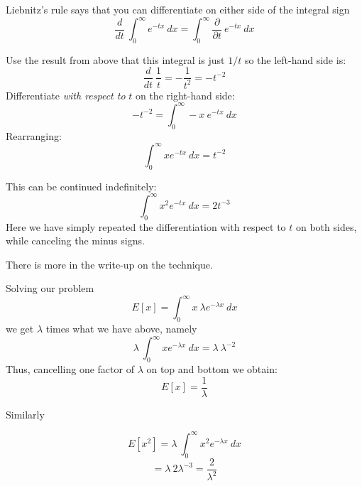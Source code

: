 \documentclass[11pt, oneside]{article}
\begin{document}
Liebnitz's rule says that you can differentiate on either side of the integral sign
\[ \frac{d}{dt} \ \int_0^{\infty} e^{-tx} \ dx = \int_0^{\infty} \frac{\partial}{\partial t} \  e^{-tx} \ dx \]

Use the result from above that this integral is just $1/t$ so the left-hand side is:
\[ \frac{d}{dt} \ \frac{1}{t} = - \frac{1}{t^2} = - t^{-2} \]
Differentiate \emph{with respect to} $t$ on the right-hand side:
\[ - t^{-2} = \int_0^{\infty} -x \  e^{-tx} \ dx \]
Rearranging:
\[ \int_0^{\infty} x e^{-tx} \ dx = t^{-2} \]

This can be continued indefinitely:
\[ \int_0^{\infty} x^2 e^{-tx} \ dx = 2 t^{-3} \]
Here we have simply repeated the differentiation with respect to $t$ on both sides, while canceling the minus signs.

There is more in the write-up on the technique.

Solving our problem
\[ E[x] = \int_0^{\infty} x \  \lambda e^{-\lambda x} \ dx \]
we get $\lambda$ times what we have above, namely
\[ \lambda \ \int_0^{\infty} x e^{-\lambda x} \ dx = \lambda \ \lambda^{-2} \]
Thus, cancelling one factor of $\lambda$ on top and bottom we obtain:
\[ E[x] = \frac{1}{\lambda} \]

Similarly

\[ E[x^2] = \lambda \ \int_0^{\infty} x^2 e^{-\lambda x} \ dx \]
\[ = \lambda \ 2 \lambda ^{-3} = \frac{2}{\lambda^2} \]
\end{document}
